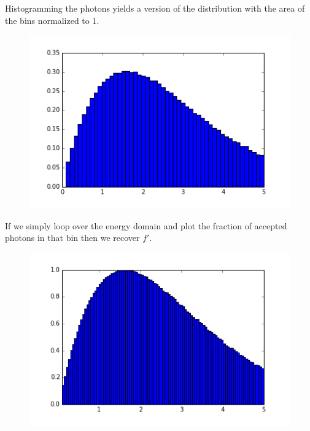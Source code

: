 \documentclass[12pt,a4paper]{article}
\begin{document}
\subsection{}
Histogramming the photons yields a version of the distribution
with the area of the bins normalized to $1$.
\begin{figure}[!h]
  \includegraphics[]{HW1_3_6_normalized.png}
\end{figure}
\newpage
If we simply loop over the energy domain and plot the fraction of accepted
photons in that bin then we recover $f'$.
\begin{figure}[!h]
  \includegraphics[]{HW1_3_6.png}
\end{figure}
\newpage
\end{document}
